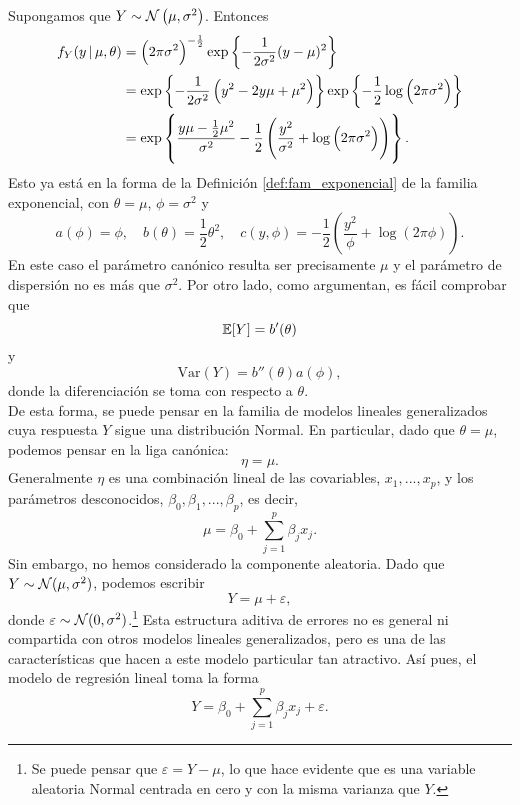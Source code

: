 Supongamos que $Y \sim \mathcal{N} \left( \mu, \sigma^2 \right)$. Entonces
\begin{align*}
	f_Y(y \, |  \, \mu, \theta) &= \left( 2 \pi \sigma^2 \right)^{-\frac{1}{2}} \mathrm{exp} \left\{ -\frac{1}{2 \sigma^2} (y - \mu)^2 \right\} \\
    &= \mathrm{exp} \left\{ -\frac{1}{2 \sigma^2} \left( y^2 - 2 y \mu + \mu^2 \right) \right\} \mathrm{exp} \left\{ -\frac{1}{2} \log\left( 2 \pi \sigma^2 \right)  \right\} \\
    &= \mathrm{exp} \left\{ \frac{y \mu - \frac{1}{2} \mu^2 }{\sigma^2} - \frac{1}{2} \left( \frac{y^2}{\sigma^2} + \log \left( 2 \pi \sigma^2 \right) \right) \right\}.
\end{align*}
Esto ya está en la forma de la Definición \ref{def:fam_exponencial} de la familia exponencial, con $\theta = \mu$, $\phi = \sigma^2$ y
\begin{equation*}
a(\phi) = \phi, \quad b(\theta) = \frac{1}{2} \theta^2, \quad c(y, \phi) = -\frac{1}{2} \left( \frac{y^2}{\phi} + \log \left( 2 \pi \phi \right) \right).
\end{equation*}
En este caso el parámetro canónico resulta ser precisamente $\mu$ y el parámetro de dispersión no es más que $\sigma^2$. Por otro lado, como \citet[Capítulo 2.2.2]{nelder_glm} argumentan, es fácil comprobar que
\begin{equation*}
	\mathbb{E}[ Y ] = b'(\theta)
\end{equation*}
y
\begin{equation*}
	\textrm{Var}(Y) = b''(\theta) a(\phi),
\end{equation*}
donde la diferenciación se toma con respecto a $\theta$.\\


De esta forma, se puede pensar en la familia de modelos lineales generalizados cuya respuesta $Y$ sigue una distribución Normal. En particular, dado que $\theta = \mu$, podemos pensar en la liga canónica:
\begin{equation*}
	\eta = \mu.
\end{equation*}
Generalmente $\eta$ es una combinación lineal de las covariables, $x_1, ..., x_p$, y los parámetros desconocidos, $\beta_0, \beta_1, ..., \beta_p$, es decir,
\begin{equation*}
	\mu = \beta_0 + \sum_{j=1}^{p} \beta_j x_j.
\end{equation*}
Sin embargo, no hemos considerado la componente aleatoria. Dado que $Y \sim \mathcal{N} (\mu, \sigma^2)$, podemos escribir
\begin{equation*}
	Y = \mu + \varepsilon,
\end{equation*}
donde $\varepsilon \sim \mathcal{N} (0, \sigma^2)$.\footnote{Se puede pensar que $\varepsilon = Y - \mu$, lo que hace evidente que es una variable aleatoria Normal centrada en cero y con la misma varianza que $Y$.} Esta estructura aditiva de errores no es general ni compartida con otros modelos lineales generalizados, pero es una de las características que hacen a este modelo particular tan atractivo. Así pues, el modelo de regresión lineal toma la forma
\begin{equation*}
	Y = \beta_0 + \sum_{j=1}^{p} \beta_j x_j + \varepsilon.
\end{equation*}


